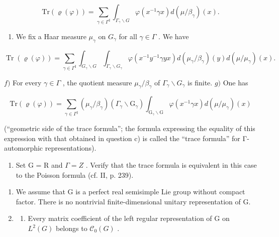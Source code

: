 \[
\mathrm{Tr} (\varrho (\varphi)) = \sum_ {\gamma \in \Gamma^ {\sharp}} \int_ {\Gamma_ {\gamma} \backslash G} \varphi (x ^ {- 1} \gamma x) d (\mu / \beta_ {\gamma}) (x).
\]

\begin{enumerate}
\def\labelenumi{\alph{enumi})}
\setcounter{enumi}{4}
\tightlist
\item
  We fix a Haar measure \(\mu_{\gamma}\) on \(G_{\gamma}\) for all \(\gamma \in \Gamma\) . We have
\end{enumerate}

\[
\operatorname{Tr} (\varrho (\varphi)) = \sum_ {\gamma \in \Gamma^ {\sharp}} \int_ {G _ {\gamma} \backslash G} \int_ {\Gamma_ {\gamma} \backslash G _ {\gamma}} \varphi (x ^ {- 1} y ^ {- 1} \gamma y x) d (\mu_ {\gamma} / \beta_ {\gamma}) (y) d (\mu / \mu_ {\gamma}) (x).
\]

\(f)\) For every \(\gamma \in \Gamma\) , the quotient measure \(\mu_{\gamma} / \beta_{\gamma}\) of \(\Gamma_{\gamma} \backslash G_{\gamma}\) is finite. \(g)\) One has

\[
\mathrm{Tr} (\varrho (\varphi)) = \sum_ {\gamma \in \Gamma^ {\sharp}} (\mu_ {\gamma} / \beta_ {\gamma}) (\Gamma_ {\gamma} \backslash \mathrm{G} _ {\gamma}) \int_ {\mathrm{G} _ {\gamma} \backslash \mathrm{G}} \varphi (x ^ {- 1} \gamma x) d (\mu / \mu_ {\gamma}) (x)
\]

(“geometric side of the trace formula”; the formula expressing the equality of this expression with that obtained in question c) is called the “trace formula” for Γ-automorphic representations).

\begin{enumerate}
\def\labelenumi{\alph{enumi})}
\setcounter{enumi}{7}
\tightlist
\item
  Set G = R and \(\Gamma = Z\) . Verify that the trace formula is equivalent in this case to the Poisson formula (cf. II, p. 239).
\end{enumerate}

\begin{enumerate}
\def\labelenumi{\arabic{enumi})}
\setcounter{enumi}{8}
\item
  We assume that G is a perfect real semisimple Lie group without compact factor. There is no nontrivial finite-dimensional unitary representation of G.
\item
  \begin{enumerate}
  \def\labelenumii{\alph{enumii})}
  \tightlist
  \item
    Every matrix coefficient of the left regular representation of G on \(L^{2}(G)\) belongs to \(\mathcal{C}_{0}(G)\) .
  \end{enumerate}
\end{enumerate}

